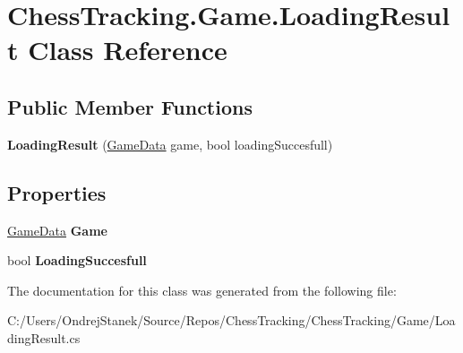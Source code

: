 \hypertarget{class_chess_tracking_1_1_game_1_1_loading_result}{}\section{Chess\+Tracking.\+Game.\+Loading\+Result Class Reference}
\label{class_chess_tracking_1_1_game_1_1_loading_result}
\subsection*{Public Member Functions}
\begin{DoxyCompactItemize}
\item 
\mbox{\label{class_chess_tracking_1_1_game_1_1_loading_result_a600da7a302ac5c3185fcb6874b9c8d8b}} 
{\bfseries Loading\+Result} (\mbox{\hyperlink{class_chess_tracking_1_1_game_1_1_game_data}{Game\+Data}} game, bool loading\+Succesfull)
\end{DoxyCompactItemize}
\subsection*{Properties}
\begin{DoxyCompactItemize}
\item 
\mbox{\label{class_chess_tracking_1_1_game_1_1_loading_result_aa73157d379c8e67a0d6e971baa660ffb}} 
\mbox{\hyperlink{class_chess_tracking_1_1_game_1_1_game_data}{Game\+Data}} {\bfseries Game}
\item 
\mbox{\label{class_chess_tracking_1_1_game_1_1_loading_result_a5c4729c47551733daaddc5cacfeb8219}} 
bool {\bfseries Loading\+Succesfull}
\end{DoxyCompactItemize}


The documentation for this class was generated from the following file\+:\begin{DoxyCompactItemize}
\item 
C\+:/\+Users/\+Ondrej\+Stanek/\+Source/\+Repos/\+Chess\+Tracking/\+Chess\+Tracking/\+Game/Loading\+Result.\+cs\end{DoxyCompactItemize}
